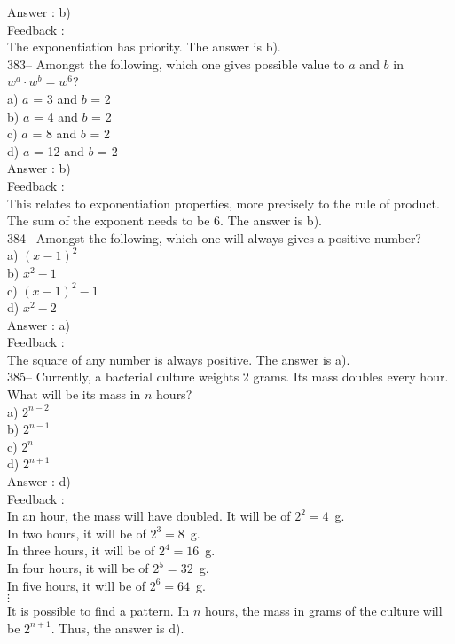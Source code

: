 ﻿\documentclass[letterpaper, 12pt]{article}
\begin{document}
Answer : b)\\

Feedback : \\
The exponentiation has priority. The answer is b).\\

383-- Amongst the following, which one gives possible value to $a$ and $b$ in $w^{a}\cdot w^{b}=w^{6}$?\\
a) $a$ = 3 and $b$ = 2\\
b) $a$ = 4 and $b$ = 2\\
c) $a$ = 8 and $b$ = 2\\
d) $a$ = 12 and $b$ = 2\\

Answer : b) \\

Feedback : \\
This relates to exponentiation properties, more precisely to the rule of product. The sum of the exponent needs to be 6. The answer is b).\\


384-- Amongst the following, which one will always gives a positive number?\\
a) $\left( x-1\right) ^2$\\
b) $x^{2}-1$\\
c) $\left( x-1\right) ^2-1$\\
d)  $x^{2}-2$\\

Answer : a)\\

Feedback : \\
The square of any number is always positive. The answer is a).\\

385-- Currently, a bacterial culture weights 2 grams.
Its mass doubles every hour. What will be its mass in $n$ hours?\\
a) $2^{n-2}$\\
b) $2^{n-1}$\\
c) $2^{n}$\\
d) $2^{n+1}$\\

Answer : d)\\


Feedback : \\
In an hour, the mass will have doubled. It will be of $2^{2}=4$~g.\\
In two hours, it will be of $2^{3}=8$~g.\\
In three hours, it will be of $2^{4}=16$~g.\\
In four hours, it will be of $2^{5}=32$~g.\\
In five hours, it will be of $2^{6}=64$~g.\\
$\vdots$\\
It is possible to find a pattern. In $n$ hours, the mass in grams of the culture will be $2^{n+1}$.  Thus, the answer is d).\\
\end{document}
